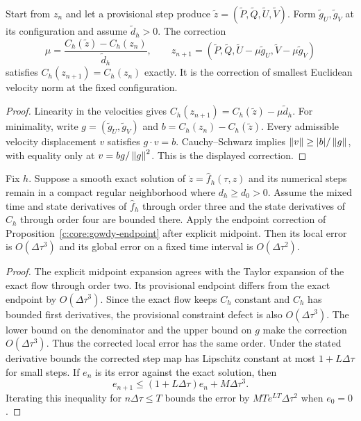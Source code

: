 \begin{proposition}
\label{c:core:gowdy-endpoint}
Start from $z_n$ and let a provisional step produce
$\widetilde z=(\widetilde P,\widetilde Q,\widetilde U,\widetilde V)$.
Form $\widetilde g_U,\widetilde g_V$ at its configuration and assume
$\widetilde d_h>0$. The correction
\[
 \mu=\frac{C_h(\widetilde z)-C_h(z_n)}{\widetilde d_h},\qquad
 z_{n+1}=(\widetilde P,\widetilde Q,
 \widetilde U-\mu\widetilde g_U,
 \widetilde V-\mu\widetilde g_V)
\]
satisfies $C_h(z_{n+1})=C_h(z_n)$ exactly. It is the correction of
smallest Euclidean velocity norm at the fixed configuration.
\end{proposition}

\begin{proof}
Linearity in the velocities gives
$C_h(z_{n+1})=C_h(\widetilde z)-\mu\widetilde d_h$.
For minimality, write $g=(\widetilde g_U,\widetilde g_V)$ and
$b=C_h(z_n)-C_h(\widetilde z)$. Every admissible velocity displacement
$v$ satisfies $g\cdot v=b$. Cauchy--Schwarz implies
$\left\lVert v\right\rVert\geq|b|/\left\lVert g\right\rVert$, with equality only at
$v=bg/\left\lVert g\right\rVert^2$. This is the displayed correction.
\end{proof}

\begin{proposition}
\label{c:core:gowdy-time-order}
Fix $h$. Suppose a smooth exact solution of
$\dot z=\widehat f_h(\tau,z)$ and its numerical steps remain in a
compact regular neighborhood where $d_h\geq d_0>0$. Assume the mixed time and state
derivatives of $\widehat f_h$ through order three and the state
derivatives of $C_h$ through order four are bounded there. Apply the endpoint correction
of Proposition~\ref{c:core:gowdy-endpoint} after explicit midpoint.
Then its local error is $O(\Delta\tau^3)$ and its global error on a
fixed time interval is $O(\Delta\tau^2)$.
\end{proposition}

\begin{proof}
The explicit midpoint expansion agrees with the Taylor expansion of
the exact flow through order two. Its provisional endpoint differs
from the exact endpoint by $O(\Delta\tau^3)$. Since the exact flow
keeps $C_h$ constant and $C_h$ has bounded first derivatives, the
provisional constraint defect is also $O(\Delta\tau^3)$. The lower
bound on the denominator and the upper bound on $g$ make the
correction $O(\Delta\tau^3)$. Thus the corrected local error has the
same order. Under the stated derivative bounds the corrected step
map has Lipschitz constant at most $1+L\Delta\tau$ for small steps.
If $e_n$ is its error against the exact solution, then
\[
 e_{n+1}\leq(1+L\Delta\tau)e_n+M\Delta\tau^3.
\]
Iterating this inequality for $n\Delta\tau\leq T$ bounds the error by
$MT e^{LT}\Delta\tau^2$ when $e_0=0$.
\end{proof}


